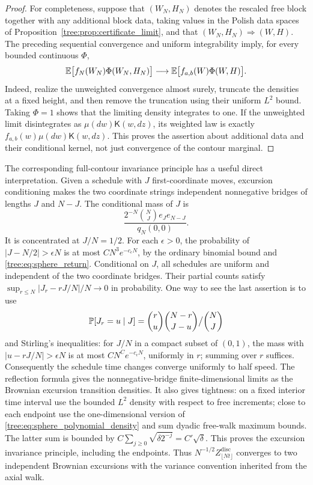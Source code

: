 \begin{proof}
For completeness, suppose that $(W_N,H_N)$ denotes the rescaled free
block together with any additional block data, taking values in the
Polish data spaces of Proposition~\ref{tree:prop:certificate_limit}, and that
$(W_N,H_N)\Rightarrow(W,H)$.  The preceding sequential convergence and
uniform integrability imply, for every bounded continuous $\Phi$,
\begin{equation}\label{tree:eq:sphere_weighted_joint_limit}
 \mathbb E\big[f_N(W_N)\Phi(W_N,H_N)\big]
       \longrightarrow \mathbb E\big[f_{a,b}(W)\Phi(W,H)\big].
\end{equation}
Indeed, realize the unweighted convergence almost surely, truncate the
densities at a fixed height, and then remove the truncation using their
uniform $L^2$ bound.  Taking $\Phi=1$ shows that the limiting density
integrates to one.  If the unweighted limit disintegrates as
$\mu(dw)\mathsf K(w,dz)$, its weighted law is exactly
$f_{a,b}(w)\mu(dw)\mathsf K(w,dz)$.  This proves the assertion about
additional data and their conditional kernel, not just convergence of
the contour marginal.
\end{proof}

The corresponding full-contour invariance principle has a useful direct
interpretation.  Given a schedule with $J$ first-coordinate moves,
excursion conditioning makes the two coordinate strings independent
nonnegative bridges of lengths $J$ and $N-J$.  The conditional mass of $J$
is
\begin{equation}\label{tree:eq:sphere_schedule_excursion}
 \frac{2^{-N}\binom NJ e_Je_{N-J}}{q_N(0,0)}.
\end{equation}
It is concentrated at $J/N=1/2$.  For each $\epsilon>0$, the probability
of $|J-N/2|>\epsilon N$ is at most
$C N^3 e^{-c_\epsilon N}$, by the ordinary binomial bound and
\eqref{tree:eq:sphere_return}.  Conditional on $J$, all schedules are uniform
and independent of the two coordinate bridges.  Their partial counts
satisfy \mbox{$\sup_{r\leq N}|J_r-rJ/N|/N\to0$} in probability.  One way to
see the last assertion is to use
\[
 \mathbb P[J_r=u\mid J]=\binom ru\binom{N-r}{J-u}\big/\binom NJ
\]
and Stirling's inequalities: for $J/N$ in a compact subset of $(0,1)$,
the mass with $|u-rJ/N|>\epsilon N$ is at most
$C N^C e^{-c_\epsilon N}$, uniformly in $r$; summing over $r$ suffices.
Consequently the schedule time changes converge uniformly to half speed.
The reflection formula gives the nonnegative-bridge finite-dimensional
limits as the Brownian excursion transition densities.  It also gives
tightness: on a fixed interior time interval use the bounded $L^2$
density with respect to free increments; close to each endpoint use the
one-dimensional version of \eqref{tree:eq:sphere_polynomial_density} and
sum dyadic free-walk maximum bounds.  The latter sum is bounded by
$C\sum_{j\geq0}\sqrt{\delta2^{-j}}=C'\sqrt\delta$.
This proves the excursion invariance principle, including the endpoints.
Thus $N^{-1/2}Z^{\mathrm{disc}}_{\lfloor Nt\rfloor}$ converges to two
independent Brownian excursions with the variance convention inherited
from the axial walk.

